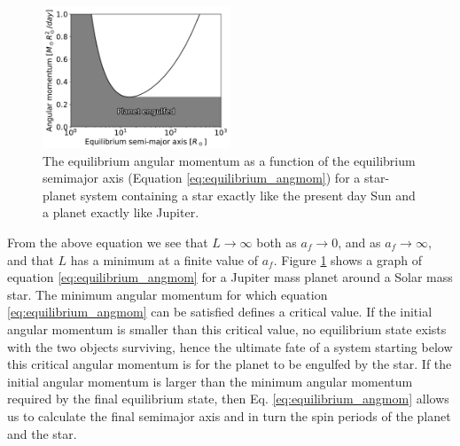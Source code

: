 \begin{figure}[t]
%
    \centering
%
    \includegraphics[width=0.5\textwidth]{equilibrium_angmom.pdf}
%
    \caption{
%
        The equilibrium angular momentum as a function of the equilibrium
        semimajor axis (Equation \eqref{eq:equilibrium_angmom}) for a
        star-planet system containing a star exactly like the present day Sun
        and a planet exactly like Jupiter.
%
    }
%
    \label{fig:equilibrium_angmom}
%
\end{figure}


From the above equation we see that $L \rightarrow \infty$ both as $a_f
\rightarrow 0$, and as $a_f \rightarrow \infty$, and that $L$ has a minimum
at a finite value of $a_f$. Figure \ref{fig:equilibrium_angmom} shows a graph of
equation \eqref{eq:equilibrium_angmom} for a Jupiter mass planet around a Solar
mass star. The minimum angular momentum for which equation
\eqref{eq:equilibrium_angmom} can be satisfied defines a critical value.  If the
initial angular momentum is smaller than this critical value, no equilibrium
state exists with the two objects surviving, hence the ultimate fate of a system
starting below this critical angular momentum is for the planet to be engulfed
by the star. If the initial angular momentum is larger than the minimum angular
momentum required by the final equilibrium state, then Eq.
\eqref{eq:equilibrium_angmom} allows us to calculate the final semimajor axis
and in turn the spin periods of the planet and the star.

